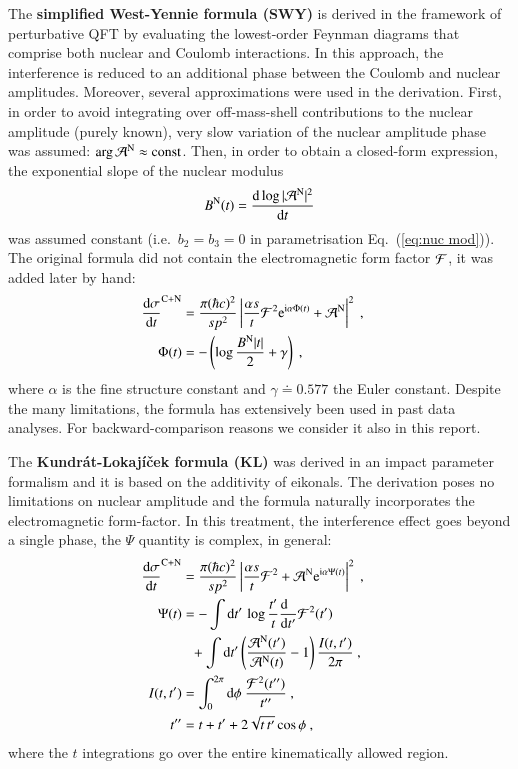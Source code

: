 The {\bf simplified West-Yennie formula (SWY)} \cite{wy68} is derived in the framework of perturbative QFT by evaluating the lowest-order Feynman diagrams that comprise both nuclear and Coulomb interactions. In this approach, the interference is reduced to an additional phase between the Coulomb and nuclear amplitudes. Moreover, several approximations were used in the derivation. First, in order to avoid integrating over off-mass-shell contributions to the nuclear amplitude (purely known), very slow variation of the nuclear amplitude phase was assumed: $\arg {\cal A}^{\rm N} \approx \hbox{const}$. Then, in order to obtain a closed-form expression, the exponential slope of the nuclear modulus
\begin{equation}
\label{eq:nuc slope}
B^{\rm N}(t) = {\d \log |{\cal A}^{\rm N}|^2 \over \d t}
\end{equation}
was assumed constant (i.e.~$b_2 = b_3 = 0$ in parametrisation Eq.~(\ref{eq:nuc mod})). The original formula did not contain the electromagnetic form factor ${\cal F}$, it was added later by hand:
\begin{equation}
\label{eq:int swy}
	\begin{aligned}
		{\d\sigma\over \d t}^{\rm C+N} &= {\pi (\hbar c)^2 \over s p^2} \left | {\alpha s\over t} {\cal F}^2 \e^{\I\alpha \Phi(t)} + {\cal A}^{\rm N} \right |^2\ ,\cr
		\Phi(t) &= - \left( \log {B^{\rm N} |t|\over 2} + \gamma \right)\ ,\cr
	\end{aligned}
\end{equation}
where $\alpha$ is the fine structure constant and $\gamma \doteq 0.577$ the Euler constant. Despite the many limitations, the formula has extensively been used in past data analyses. For backward-comparison reasons we consider it also in this report.

The {\bf Kundr\' at-Lokaj\' i\v cek formula (KL)} \cite{kl94} was derived in an impact parameter formalism and it is based on the additivity of eikonals. The derivation poses no limitations on nuclear amplitude and the formula naturally incorporates the electromagnetic form-factor. In this treatment, the interference effect goes beyond a single phase, the $\Psi$ quantity is complex, in general:
\begin{equation}
\label{eq:int kl}
	\begin{aligned}
		{\d\sigma\over \d t}^{\rm C+N} &= {\pi (\hbar c)^2 \over s p^2} \left | {\alpha s\over t} {\cal F}^2 + {\cal A}^{\rm N} \e^{\I\alpha \Psi(t)} \right |^2\ ,\cr
		\Psi(t) &= 
			- \int \d t'\, \log {t'\over t} {\d\phantom{t'}\over \d t'} {\cal F}^2(t') \cr
		&\phantom{=} + \int \d t' \left( {{\cal A}^{\rm N}(t') \over {\cal A}^{\rm N}(t)} - 1 \right) { I(t, t')\over 2\pi }
			\ ,\cr
		I(t, t') &= \int_0^{2\pi} \d\phi\ {{\cal F}^2(t'')\over t''}\ , \cr
		t'' &= t + t' + 2\sqrt{t\, t'} \cos\phi\ ,\cr
	\end{aligned}
\end{equation}
where the $t$ integrations go over the entire kinematically allowed region.

